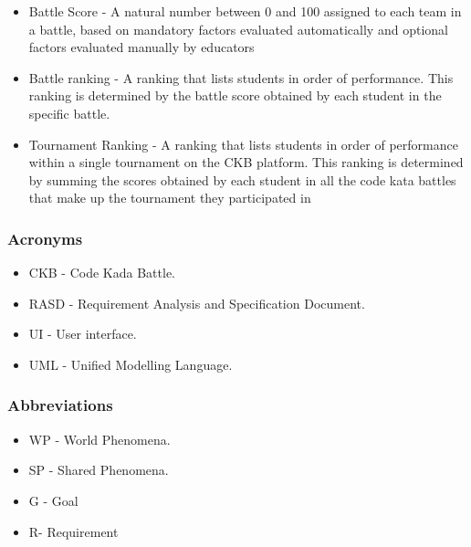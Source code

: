\begin{itemize}
    \item  Battle Score - A natural number between 0 and 100 assigned to each team in a battle, based on mandatory factors evaluated automatically and optional factors evaluated manually by educators
    \item Battle ranking - A ranking that lists students in order of performance. This ranking is determined by the battle score obtained by each student in the specific battle.
    \item Tournament Ranking - A ranking that lists students in order of performance within a single tournament on the CKB platform. This ranking is determined by summing the scores obtained by each student in all the code kata battles that make up the tournament they participated in
\end{itemize}
\subsubsection{Acronyms}
\begin{itemize}
    \item CKB - Code Kada Battle.
    \item RASD - Requirement Analysis and Specification Document. 
    \item UI - User interface. 
    \item UML - Unified Modelling Language.
\end{itemize}
\subsubsection{Abbreviations}
\begin{itemize}
    \item WP - World Phenomena.
    \item SP - Shared Phenomena.
    \item G - Goal
    \item R- Requirement
\end{itemize}


